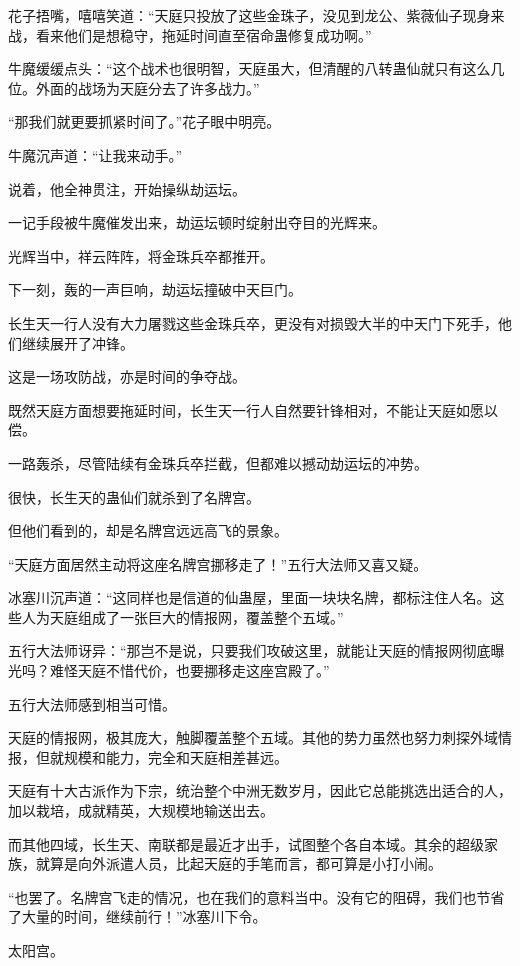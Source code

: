 \begin{this_body}
花子捂嘴，嘻嘻笑道：“天庭只投放了这些金珠子，没见到龙公、紫薇仙子现身来战，看来他们是想稳守，拖延时间直至宿命蛊修复成功啊。”

牛魔缓缓点头：“这个战术也很明智，天庭虽大，但清醒的八转蛊仙就只有这么几位。外面的战场为天庭分去了许多战力。”

“那我们就更要抓紧时间了。”花子眼中明亮。

牛魔沉声道：“让我来动手。”

说着，他全神贯注，开始操纵劫运坛。

一记手段被牛魔催发出来，劫运坛顿时绽射出夺目的光辉来。

光辉当中，祥云阵阵，将金珠兵卒都推开。

下一刻，轰的一声巨响，劫运坛撞破中天巨门。

长生天一行人没有大力屠戮这些金珠兵卒，更没有对损毁大半的中天门下死手，他们继续展开了冲锋。

这是一场攻防战，亦是时间的争夺战。

既然天庭方面想要拖延时间，长生天一行人自然要针锋相对，不能让天庭如愿以偿。

一路轰杀，尽管陆续有金珠兵卒拦截，但都难以撼动劫运坛的冲势。

很快，长生天的蛊仙们就杀到了名牌宫。

但他们看到的，却是名牌宫远远高飞的景象。

“天庭方面居然主动将这座名牌宫挪移走了！”五行大法师又喜又疑。

冰塞川沉声道：“这同样也是信道的仙蛊屋，里面一块块名牌，都标注住人名。这些人为天庭组成了一张巨大的情报网，覆盖整个五域。”

五行大法师讶异：“那岂不是说，只要我们攻破这里，就能让天庭的情报网彻底曝光吗？难怪天庭不惜代价，也要挪移走这座宫殿了。”

五行大法师感到相当可惜。

天庭的情报网，极其庞大，触脚覆盖整个五域。其他的势力虽然也努力刺探外域情报，但就规模和能力，完全和天庭相差甚远。

天庭有十大古派作为下宗，统治整个中洲无数岁月，因此它总能挑选出适合的人，加以栽培，成就精英，大规模地输送出去。

而其他四域，长生天、南联都是最近才出手，试图整个各自本域。其余的超级家族，就算是向外派遣人员，比起天庭的手笔而言，都可算是小打小闹。

“也罢了。名牌宫飞走的情况，也在我们的意料当中。没有它的阻碍，我们也节省了大量的时间，继续前行！”冰塞川下令。

太阳宫。


\end{this_body}

